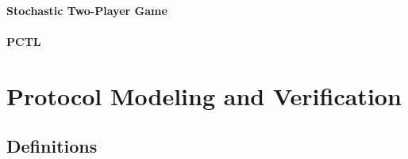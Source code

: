\documentclass{llncs}
\begin{document}

\paragraph{Stochastic Two-Player Game}

\paragraph{PCTL}

\section{Protocol Modeling and Verification}

\subsection{Definitions}
\end{document}
